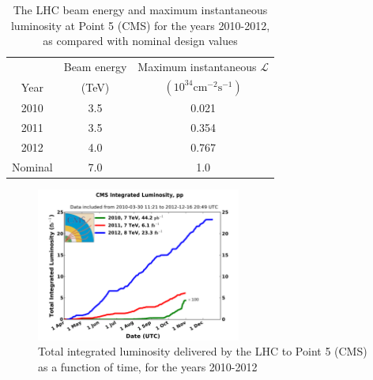 \begin{table}
  \centering
  \begin{tabular}{c|c|c}
    &  Beam energy & Maximum instantaneous $\mathcal{L}$ \\
    Year &(TeV) & $(10^{34}\text{cm}^{-2}\text{s}^{-1})$ \\
    \hline\hline
    2010 & 3.5 & 0.021 \\
    2011 & 3.5 & 0.354 \\ 
    2012 & 4.0 & 0.767 \\
    \hline
    Nominal & 7.0 & 1.0 \\
  \end{tabular}
  \caption{The LHC beam energy and maximum
    instantaneous luminosity at Point 5 (CMS) for the years 2010-2012, as compared with nominal design values \cite{cms-lumi}}
  \label{tab:lhc-lumi-values}
\end{table}

\begin{figure}
  \centering
  \includegraphics[width=0.6\textwidth]{tex/lhc/fig/int_lumi_cms.pdf}
  \caption{Total integrated luminosity delivered by the LHC to Point 5 (CMS) as a function of time, for the years 2010-2012 \cite{cms-lumi}}
  \label{fig:lumi}
\end{figure}
